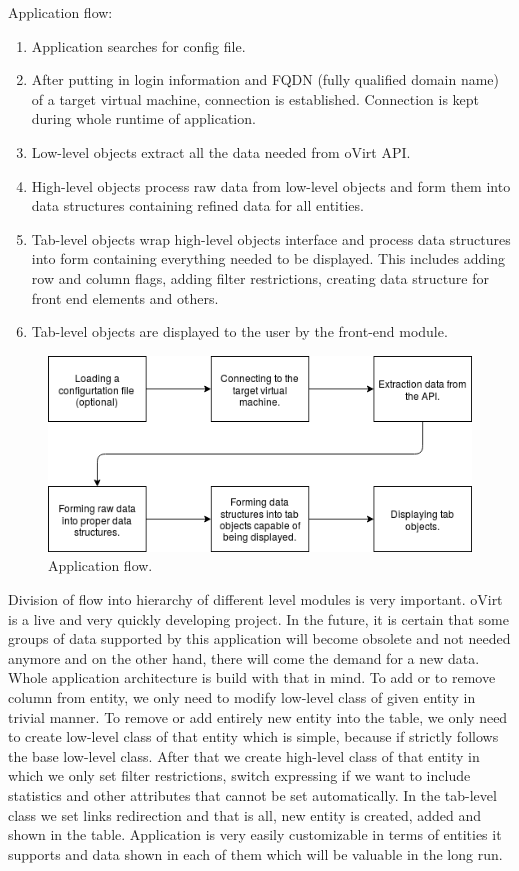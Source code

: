Application flow:
\begin{enumerate}
\item Application searches for config file.
\item After putting in login information and FQDN (fully qualified domain name) of a target virtual machine, connection is established. Connection is kept during whole runtime of application. 
\item Low-level objects extract all the data needed from oVirt API.
\item High-level objects process raw data from low-level objects and form them into data structures containing refined data for all entities.
\item Tab-level objects wrap high-level objects interface and process data structures into form containing everything needed to be displayed. This includes adding row and column flags, adding filter restrictions, creating data structure for front end elements and others.
\item Tab-level objects are displayed to the user by the front-end module.
\end{enumerate}

\begin{figure}[H]
\centering
\includegraphics[scale=0.65]{application_flow.png}
\caption{Application flow.}
\end{figure}

Division of flow into hierarchy of different level modules is very important. oVirt is a live and very quickly developing project. In the future, it is certain that some groups of data supported by this application will become obsolete and not needed anymore and on the other hand, there will come the demand for a new data. Whole application architecture is build with that in mind. To add or to remove column from entity, we only need to modify low-level class of given entity in trivial manner. To remove or add entirely new entity into the table, we only need to create low-level class of that entity which is simple, because if strictly follows the base low-level class. After that we create high-level class of that entity in which we only set filter restrictions, switch expressing if we want to include statistics and other attributes that cannot be set automatically. In the tab-level class we set links redirection and that is all, new entity is created, added and shown in the table. Application is very easily customizable in terms of entities it supports and data shown in each of them which will be valuable in the long run.

